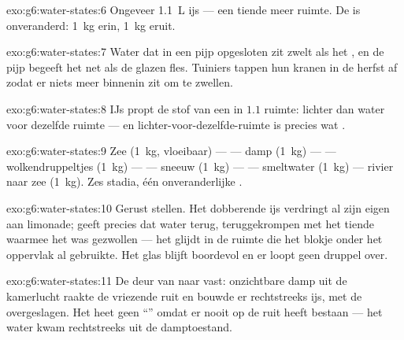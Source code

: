 \begin{solution}{exo:g6:water-states:6}
Ongeveer \qty{1.1}{L} ijs --- een tiende meer ruimte. De  is
onveranderd: \qty{1}{kg} erin, \qty{1}{kg} eruit.
\end{solution}

\begin{solution}{exo:g6:water-states:7}
Water dat in een pijp opgesloten zit zwelt als het , en de
pijp begeeft het net als de glazen fles. Tuiniers tappen hun kranen in
de herfst af zodat er niets meer binnenin zit om te zwellen.
\end{solution}

\begin{solution}{exo:g6:water-states:8}
IJs propt de stof van een  in $1.1$  ruimte: lichter dan
water voor dezelfde ruimte --- en lichter-voor-dezelfde-ruimte is
precies wat .
\end{solution}

\begin{solution}{exo:g6:water-states:9}
Zee (\qty{1}{kg}, vloeibaar) ---  --- damp
(\qty{1}{kg}) ---  --- wolkendruppeltjes (\qty{1}{kg})
---  --- sneeuw (\qty{1}{kg}) ---  --- smeltwater
(\qty{1}{kg}) --- rivier naar zee (\qty{1}{kg}). Zes stadia, één
onveranderlijke .
\end{solution}

\begin{solution}{exo:g6:water-states:10}
Gerust stellen. Het dobberende ijs verdringt al zijn eigen
\emph{} aan limonade;  geeft precies dat water terug,
teruggekrompen met het tiende waarmee het was gezwollen --- het glijdt
in de ruimte die het blokje onder het oppervlak al gebruikte. Het glas
blijft boordevol en er loopt geen druppel over.
\end{solution}

\begin{solution}{exo:g6:water-states:11}
De deur van  naar vast: onzichtbare damp uit de kamerlucht raakte
de vriezende ruit en bouwde er rechtstreeks ijs, met de
 overgeslagen. Het heet geen ``'' omdat er nooit
 op de ruit heeft bestaan --- het water kwam rechtstreeks
uit de damptoestand.
\end{solution}


